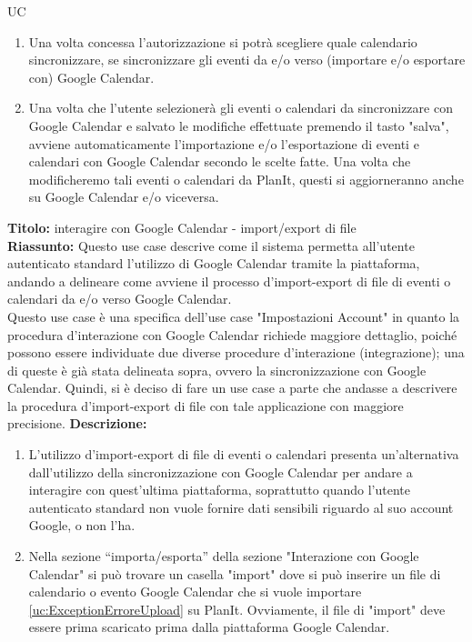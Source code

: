 \begin{listaPersonale}{UC}
\begin{listaPersonale2}[UC] {}
\begin{listaPersonale3}[UC]{}
\begin{enumerate}
                \item Una volta concessa l'autorizzazione si potrà scegliere quale calendario sincronizzare, se sincronizzare gli eventi da e/o verso (importare e/o esportare con) Google Calendar.
                \item Una volta che l'utente selezionerà gli eventi o calendari da sincronizzare con Google Calendar e salvato le modifiche effettuate premendo il tasto "salva", avviene automaticamente l'importazione e/o l'esportazione di eventi e calendari con Google Calendar secondo le scelte fatte. Una volta che modificheremo tali eventi o calendari da PlanIt, questi si aggiorneranno anche su Google Calendar e/o viceversa.
            \end{enumerate}

            \textbf{Titolo: } interagire con Google Calendar - import/export di file\\
            \textbf{Riassunto: } Questo use case descrive come il sistema permetta all'utente autenticato standard l'utilizzo di Google Calendar tramite la piattaforma, andando a delineare come avviene il processo d'import-export di file di eventi o calendari da e/o verso Google Calendar. \\
            Questo use case è una specifica dell'use case "Impostazioni Account" in quanto la procedura d'interazione con Google Calendar richiede maggiore dettaglio, poiché possono essere individuate due diverse procedure d'interazione (integrazione); una di queste è già stata delineata sopra, ovvero la sincronizzazione con Google Calendar. Quindi, si è deciso di fare un use case a parte che andasse a descrivere la procedura d'import-export di file con tale applicazione con maggiore precisione.
            \textbf{Descrizione: }
            \begin{enumerate}
                \item L'utilizzo d'import-export di file di eventi o calendari presenta un'alternativa dall'utilizzo della sincronizzazione con Google Calendar per andare a interagire con quest'ultima piattaforma, soprattutto quando l'utente autenticato standard non vuole fornire dati sensibili riguardo al suo account Google, o non l'ha.
                \item Nella sezione “importa/esporta” della sezione "Interazione con Google Calendar" si può trovare un casella "import" dove si può inserire un file di calendario o evento Google Calendar che si vuole importare \ref{uc:ExceptionErroreUpload} su PlanIt. Ovviamente, il file di "import" deve essere prima scaricato prima dalla piattaforma Google Calendar.

\end{enumerate}
\end{listaPersonale3}
\end{listaPersonale2}
\end{listaPersonale}
